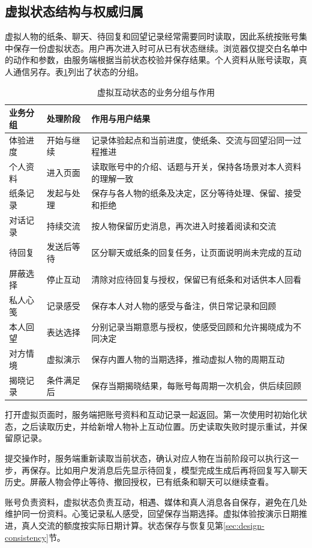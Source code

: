 \subsection{虚拟状态结构与权威归属}
虚拟人物的纸条、聊天、待回复和回望记录经常需要同时读取，因此系统按账号集中保存一份虚拟状态。用户再次进入时可从已有状态继续。浏览器仅提交白名单中的动作和参数，由服务端根据当前状态校验并保存结果。个人资料从账号读取，真人通信另存。表\ref{tab:design-state}列出了状态的分组。

\begin{table}[H]
\centering\small\linespread{1.15}\selectfont
\caption{虚拟互动状态的业务分组与作用}\label{tab:design-state}
\begin{tabularx}{\linewidth}{@{}p{.27\linewidth}p{.17\linewidth}X@{}}
\toprule 业务分组 & 处理阶段 & 作用与用户结果 \\ \midrule
体验进度 & 开始与继续 & 记录体验起点和当前进度，使纸条、交流与回望沿同一过程推进 \\
个人资料 & 进入页面 & 读取账号中的介绍、话题与开关，保持各场景对本人资料的理解一致 \\
纸条记录 & 发起与处理 & 保存与各人物的纸条及决定，区分等待处理、保留、接受和拒绝 \\
对话记录 & 持续交流 & 按人物保留历史消息，再次进入时接着阅读和交流 \\
待回复 & 发送后等待 & 区分聊天或纸条的回复任务，让页面说明尚未完成的互动 \\
屏蔽选择 & 停止互动 & 清除对应待回复与授权，保留已有纸条和对话供本人回看 \\
私人心笺 & 记录感受 & 保存本人对人物的感受与备注，供日常记录和回顾 \\
本人回望 & 表达选择 & 分别记录当期意愿与授权，使感受回顾和允许揭晓成为不同决定 \\
对方情境 & 虚拟演示 & 保存内置人物的当期选择，推动虚拟人物的周期互动 \\
揭晓记录 & 条件满足后 & 保存当期揭晓结果，每账号每周期一次机会，供后续回顾 \\
\bottomrule
\end{tabularx}
\end{table}

打开虚拟页面时，服务端把账号资料和互动记录一起返回。第一次使用时初始化状态，之后读取历史，并给新增人物补上互动位置。历史读取失败时提示重试，并保留原记录。

提交操作时，服务端重新读取当前状态，确认对应人物在当前阶段可以执行这一步，再保存。比如用户发消息后先显示待回复，模型完成生成后再将回复写入聊天历史。屏蔽人物会停止等待、撤回授权，已有纸条和聊天可以继续查看。

账号负责资料，虚拟状态负责互动，相遇、媒体和真人消息各自保存，避免在几处维护同一份资料。心笺记录私人感受，回望保存当期选择。虚拟体验按演示日期推进，真人交流的额度按实际日期计算。状态保存与恢复见第\ref{sec:design-consistency}节。

\clearpage
